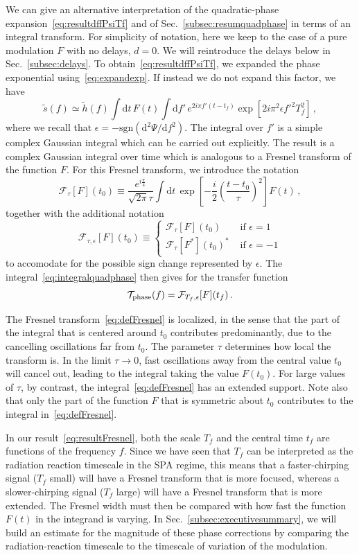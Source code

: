 \documentclass[aps,showpacs,twocolumn,
prd,superscriptaddress,nofootinbib]{revtex4-1}
\newcommand{\be}{\begin{equation}}
\newcommand{\ee}{\end{equation}}
\newcommand\ud{{\mathrm{d}}}
\newcommand\calF{{\mathcal{F}}}
\newcommand\calT{{\mathcal{T}}}
\newcommand{\tf}{t_{f}}
\newcommand{\Tf}{T_{f}}
\begin{document}
We can give an alternative interpretation of the quadratic-phase expansion~\eqref{eq:resultdffPsiTf} and of Sec.~\ref{subsec:resumquadphase} in terms of an integral transform. For simplicity of notation, here we keep to the case of a pure modulation $F$ with no delays, $d=0$. We will reintroduce the delays below in Sec.~\ref{subsec:delays}. To obtain~\eqref{eq:resultdffPsiTf}, we expanded the phase exponential using~\eqref{eq:expandexp}. If instead we do not expand this factor, we have
\be\label{eq:integralquadphase}
	\tilde{s}(f)	\simeq \tilde{h}(f) \int \ud t\, F(t) \int\ud f'\, e^{2i\pi f' (t-\tf)} \exp\left[ 2i\pi^{2} \epsilon{f'}^{2} \Tf^{2} \right] \,,
\ee
where we recall that $\epsilon = -\mathrm{sgn}(\ud ^{2} \Psi/\ud f^{2})$. The integral over $f'$ is a simple complex Gaussian integral which can be carried out explicitly. The result is a complex Gaussian integral over time which is analogous to a Fresnel transform of the function $F$. For this Fresnel transform, we introduce the notation
\be\label{eq:defFresnel}
	\calF_{\tau}[F](t_{0}) \equiv \frac{e^{i\frac{\pi}{4}}}{\sqrt{2\pi} \tau} \int \ud t \, \exp\left[ - \frac{i}{2} \left( \frac{t-t_{0}}{\tau} \right)^{2}\right] F(t) \,,
\ee
together with the additional notation
\be\label{eq:Fresnelsign}
	\calF_{\tau, \epsilon}[F](t_{0}) \equiv
\begin{cases}
	 \calF_{\tau}[F](t_{0}) &\text{ if } \epsilon=1 \\
	 \calF_{\tau}[F^{*}](t_{0})^{*} &\text{ if } \epsilon=-1
\end{cases}
\ee
to accomodate for the possible sign change represented by $\epsilon$. The integral~\eqref{eq:integralquadphase} then gives for the transfer function
\be\label{eq:resultFresnel}
	\calT_{\rm phase}(f) = \calF_{\Tf, \epsilon}[F](\tf) \,.
\ee

The Fresnel transform~\eqref{eq:defFresnel} is localized, in the sense that the part of the integral that is centered around $t_{0}$ contributes predominantly, due to the cancelling oscillations far from $t_{0}$. The parameter $\tau$ determines how local the transform is. In the limit $\tau\rightarrow 0$, fast oscillations away from the central value $t_{0}$ will cancel out, leading to the integral taking the value $F(t_{0})$. For large values of $\tau$, by contrast, the integral~\eqref{eq:defFresnel} has an extended support. Note also that only the part of the function $F$ that is symmetric about $t_{0}$ contributes to the integral in~\eqref{eq:defFresnel}.

In our result~\eqref{eq:resultFresnel}, both the scale $\Tf$ and the central time $\tf$ are functions of the frequency $f$. Since we have seen that $\Tf$ can be interpreted as the radiation reaction timescale in the SPA regime, this means that a faster-chirping signal ($\Tf$ small) will have a Fresnel transform that is more focused, whereas a slower-chirping signal ($\Tf$ large) will have a Fresnel transform that is more extended. The Fresnel width must then be compared with how fast the function $F(t)$ in the integrand is varying. In Sec.~\ref{subsec:executivesummary}, we will build an estimate for the magnitude of these phase corrections by comparing the radiation-reaction timescale to the timescale of variation of the modulation.
\end{document}
